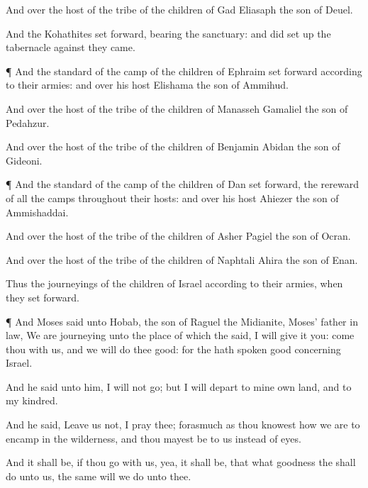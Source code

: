 {And over the
host of the
tribe of the
children of
Gad
{}
Eliasaph the
son of
Deuel.

And the
Kohathites set
forward,
bearing the
sanctuary: and
{} did set
up the
tabernacle against they
came.


\par }{\PP {}¶ And the
standard of the
camp of the
children of
Ephraim set
forward according to their
armies: and over his
host
{}
Elishama the
son of
Ammihud.

And over the
host of the
tribe of the
children of
Manasseh
{}
Gamaliel the
son of
Pedahzur.

And over the
host of the
tribe of the
children of
Benjamin
{}
Abidan the
son of
Gideoni.


\par }{\PP {}¶ And the
standard of the
camp of the
children of
Dan set
forward,
{} the
rereward of all the
camps throughout their
hosts: and over his
host
{}
Ahiezer the
son of
Ammishaddai.

And over the
host of the
tribe of the
children of
Asher
{}
Pagiel the
son of
Ocran.

And over the
host of the
tribe of the
children of
Naphtali
{}
Ahira the
son of
Enan.

Thus
{} the
journeyings of the
children of
Israel according to their
armies, when they set
forward.


\par }{\PP {}¶ And
Moses
said unto
Hobab, the
son of
Raguel the
Midianite,
Moses’ father in
law, We are
journeying unto the
place of which the
{}
said, I will
give it you:
come thou with us, and we will do thee
good: for the
{} hath
spoken
good concerning
Israel.

And he
said unto him, I will not
go; but I will
depart to mine own
land, and to my
kindred.

And he
said,
Leave us not, I pray thee; forasmuch as thou
knowest how we are to
encamp in the
wilderness, and thou mayest be to us instead of
eyes.

And it shall be, if thou
go with us, yea, it shall be, that what
goodness the
{} shall
do unto us, the same will we
do unto thee.


}
